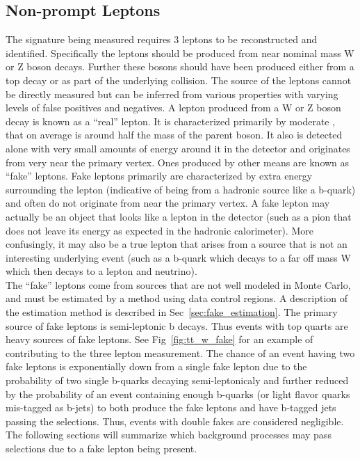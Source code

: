 		\subsection{Non-prompt Leptons}		
		The \ttZ signature being measured requires 3 leptons to be reconstructed and identified. Specifically the leptons should be produced from near nominal mass W or Z boson decays. Further these bosons should have been produced either from a top decay or as part of the underlying collision. The source of the leptons cannot be directly measured but can be inferred from various properties with varying levels of false positives and negatives. A lepton produced from a W or Z boson decay is known as a ``real'' lepton. It is characterized primarily by moderate \pt, that on average is around half the mass of the parent boson. It also is detected alone with very small amounts of energy around it in the detector and originates from very near the primary vertex. Ones produced by other means are known as ``fake'' leptons. Fake leptons primarily are characterized by extra energy surrounding the lepton (indicative of being from a hadronic source like a b-quark) and often do not originate from near the primary vertex. A fake lepton may actually be an object that looks like a lepton in the detector (such as a pion that does not leave its energy as expected in the hadronic calorimeter). More confusingly, it may also be a true lepton that arises from a source that is not an interesting underlying event (such as a b-quark which decays to a far off mass W which then decays to a lepton and neutrino).\\
		
		The ``fake'' leptons come from sources that are not well modeled in Monte Carlo, and must be estimated by a method using data control regions. A description of the estimation method is described in Sec~\ref{sec:fake_estimation}. The primary source of fake leptons is semi-leptonic b decays. Thus events with top quarts are heavy sources of fake leptons. See Fig~\ref{fig:tt_w_fake} for an example of \ttbar contributing to the three lepton measurement. The chance of an event having two fake leptons is exponentially down from a single fake lepton due to the probability of two single b-quarks decaying semi-leptonicaly and further reduced by the probability of an event containing enough b-quarks (or light flavor quarks mis-tagged as b-jets) to both produce the fake leptons and have b-tagged jets passing the selections. Thus,  events with double fakes are considered negligible. The following sections will summarize which background processes may pass selections due to a fake lepton being present.\\
		
